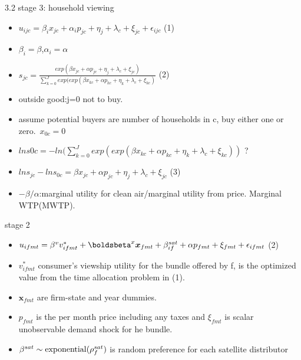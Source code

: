 \documentclass[10pt]{beamer}
\begin{document}
\begin{frame}{3.2 stage 3: household viewing}
    \begin{itemize}
        \item $u_{ijc}=\beta_{i}x_{jc}+\alpha_{i}p_{jc}+\eta_j+\lambda_c+\xi_{jc}+\epsilon_{ijc}$ (1)
        \item $\beta_i=\beta$,$\alpha_i=\alpha$
        \item $s_{jc}=\frac{exp(\beta x_{jc}+\alpha p_{jc}+\eta_j+\lambda_c+\xi_{jc})}{\sum_{k=0}^J exp(exp(\beta x_{kc}+\alpha p_{kc}+\eta_k+\lambda_c+\xi_{kc})}$ (2)
        \item outside good:j=0 not to buy.
        \item assume potential buyers are number of households in c, buy either one or zero.\
        $x_{0c}=0$
        \item $lns{0c} = -ln(\sum_{k=0}^J exp(exp(\beta x_{kc}+\alpha p_{kc}+\eta_k+\lambda_c+\xi_{kc}))$ ?
        \item $lns_{jc}-lns_{0c}=\beta x_{jc}+\alpha p_{jc}+\eta_j+\lambda_c+\xi_{jc}$ (3)
        \item $-\beta/\alpha$:marginal utility for clean air/marginal utility from price. Marginal WTP(MWTP).
    \end{itemize}
\end{frame}

\begin{frame}{stage 2}
    \begin{itemize}
        \item $u_{ifmt}=\beta^{v}v^{*}_{ifmt}+\boldsbeta^{x}\boldsymbol{x}_{fmt}+\beta^{sat}_{if}+\alpha p_{fmt}+\xi_{fmt}+\epsilon_{ifmt}$ (2)
        \item $v^{*}_{ifmt}$ consumer's viewship utility for the bundle offered by f, is the optimized value from the time allocation problem in (1).
        \item $\boldsymbol{x}_{fmt}$ are firm-state and year dummies.
        \item $p_{fmt}$ is the per month price including any taxes and $\xi_{fmt}$ is scalar unobservable demand shock for he bundle.
        \item $\beta^{sat} \sim {\rm exponential}(\rho_{f}^{sat})$ is random preference for each satellite distributor
    \end{itemize}
\end{frame}
\end{document}

